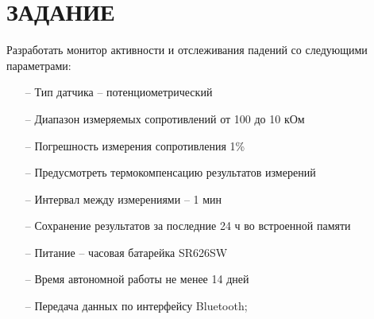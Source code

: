 \begin{sloppypar} %
\newpage %
\section*{ЗАДАНИЕ} %

Разработать монитор активности и отслеживания падений  со следующими параметрами: 

\begin{itemize}

	\item[--]Тип датчика -- потенциометрический
	\item[--]Диапазон измеряемых сопротивлений от 100 до 10 кОм

	\item[--]Погрешность измерения сопротивления 1\%

	\item[--]Предусмотреть термокомпенсацию результатов измерений

	\item[--]Интервал между измерениями -- 1 мин

	\item[--]Сохранение результатов за последние 24 ч во встроенной памяти

	\item[--]Питание -- часовая батарейка SR626SW
	\item[--]Время автономной работы не менее 14 дней
	\item[--]Передача данных по интерфейсу Bluetooth;

\end{itemize}
\end{sloppypar}
